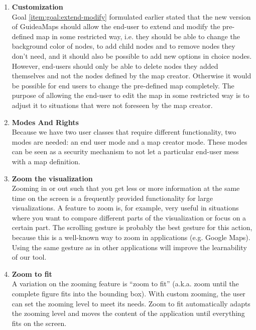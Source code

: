 \begin{enumerate}[label=\textbf{\arabic*}., ref=\arabic*]
	
	\item \textbf{Customization\label{item:customization}} \hfill \\
	Goal \ref{item:goal:extend-modify} formulated earlier stated that the new version of GuideaMaps should allow the end-user to extend and modify the pre-defined map in some restricted way, i.e. they should be able to change the background color of nodes, to add child nodes and to remove nodes they don't need, and it should also be possible to add new options in choice nodes. However, end-users should only be able to delete nodes they added themselves and not the nodes defined by the map creator. Otherwise it would be possible for end users to change the pre-defined map completely. The purpose of allowing the end-user to edit the map in some restricted way is to adjust it to situations that were not foreseen by the map creator.
  
	\item \textbf{Modes And Rights\label{item:modes-rights}} \hfill \\
	Because we have two user classes that require different functionality, two modes are needed: an end user mode and a map creator mode. These modes can be seen as a security mechanism to not let a particular end-user mess with a map definition.
  
	\item \textbf{Zoom the visualization}\label{item:zoom} \hfill \\
	Zooming in or out such that you get less or more information at the same time on the screen is a frequently provided functionality for large visualizations. A feature to zoom is, for example, very useful in situations where you want to compare different parts of the visualization or focus on a certain part. The scrolling gesture is probably the best gesture for this action, because this is a well-known way to zoom in applications (e.g. Google Maps). Using the same gesture as in other applications will improve the learnability of our tool.
	
	\item \textbf{Zoom to fit\label{item:zoom-to-fit}} \hfill \\
	A variation on the zooming feature is ``zoom to fit'' (a.k.a. zoom until the complete figure fits into the bounding box). With custom zooming, the user can set the zooming level to meet its needs. Zoom to fit automatically adapts the zooming level and moves the content of the application until everything fits on the screen.
	

\end{enumerate}
